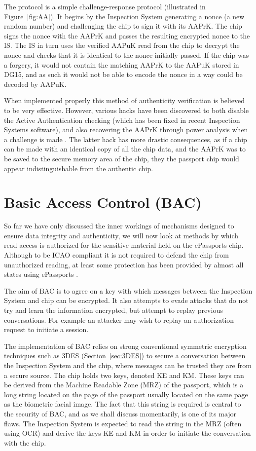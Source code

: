 \documentclass[12pt]{article}
\begin{document}
The protocol is a simple challenge-response protocol (illustrated in Figure~\ref{fig:AA}). It begins by the Inspection System generating a nonce (a new random number) and challenging the chip to sign it with its AAPrK. The chip signs the nonce with the AAPrK and passes the resulting encrypted nonce to the IS. The IS in turn uses the verified AAPuK read from the chip to decrypt the nonce and checks that it is identical to the nonce initially passed. If the chip was a forgery, it would not contain the matching AAPrK to the AAPuK stored in DG15, and as such it would not be able to encode the nonce in a way could be decoded by AAPuK. 

When implemented properly this method of authenticity verification is believed to be very effective. However, various hacks have been discovered to both disable the Active Authentication checking (which has been fixed in recent Inspection Systems software), and also recovering the AAPrK through power analysis when a challenge is made \cite{Witteman:2005ta}. The latter hack has more drastic consequences, as if a chip can be made with an identical copy of all the chip data, and the AAPrK was to be saved to the secure memory area of the chip, they the passport chip would appear indistinguishable from the authentic chip.

\section{Basic Access Control (BAC)}
\label{sec:BAC}
So far we have only discussed the inner workings of mechanisms designed to ensure data integrity and authenticity, we will now look at methods by which read access is authorized for the sensitive material held on the ePassports chip. Although to be ICAO compliant it is not required to defend the chip from unauthorized reading, at least some protection has been provided by almost all states using ePassports \cite{Chothia:2010wf}.

The aim of BAC is to agree on a key with which messages between the Inspection System and chip can be encrypted. It also attempts to evade attacks that do not try and learn the information encrypted, but attempt to replay previous conversations. For example an attacker may wish to replay an authorization request to initiate a session.

The implementation of BAC relies on strong conventional symmetric encryption techniques such as 3DES (Section~\ref{sec:3DES}) to secure a conversation between the Inspection System and the chip, where messages can be trusted they are from a secure source. The chip holds two keys, denoted KE and KM. These keys can be derived from the Machine Readable Zone (MRZ) of the passport, which is a long string located on the page of the passport usually located on the same page as the biometric facial image. The fact that this string is required is central to the security of BAC, and as we shall discuss momentarily, is one of its major flaws. The Inspection System is expected to read the string in the MRZ (often using OCR) and derive the keys KE and KM in order to initiate the conversation with the chip.
\end{document}
